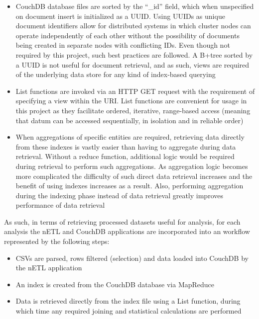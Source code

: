 \begin{itemize}
    \item CouchDB database files are sorted by the ``\_id'' field, which when unspecified on document insert is initialized as a UUID. Using UUIDs as unique document identifiers allow for distributed systems in which cluster nodes can operate independently of each other without the possibility of documents being created in separate nodes with conflicting IDs. Even though not required by this project, such best practices are followed. A B+tree sorted by a UUID is not useful for document retrieval, and as such, views are required of the underlying data store for any kind of index-based querying
    \item List functions are invoked via an HTTP GET request with the requirement of specifying a view within the URI. List functions are convenient for usage in this project as they facilitate ordered, iterative, range-based access (meaning that datum can be accessed sequentially, in isolation and in reliable order)
    \item When aggregations of specific entities are required, retrieving data directly from these indexes is vastly easier than having to aggregate during data retrieval. Without a reduce function, additional logic would be required during retrieval to perform such aggregations. As aggregation logic becomes more complicated the difficulty of such direct data retrieval increases and the benefit of using indexes increases as a result. Also, performing aggregation during the indexing phase instead of data retrieval greatly improves performance of data retrieval
\end{itemize}

As such, in terms of retrieving processed datasets useful for analysis, for each analysis the nETL and CouchDB applications are incorporated into an workflow represented by the following steps:

\begin{itemize}
    \item CSVs are parsed, rows filtered (selection) and data loaded into CouchDB by the nETL application
    \item An index is created from the CouchDB database via MapReduce
    \item Data is retrieved directly from the index file using a List function, during which time any required joining and statistical calculations are performed
\end{itemize}

